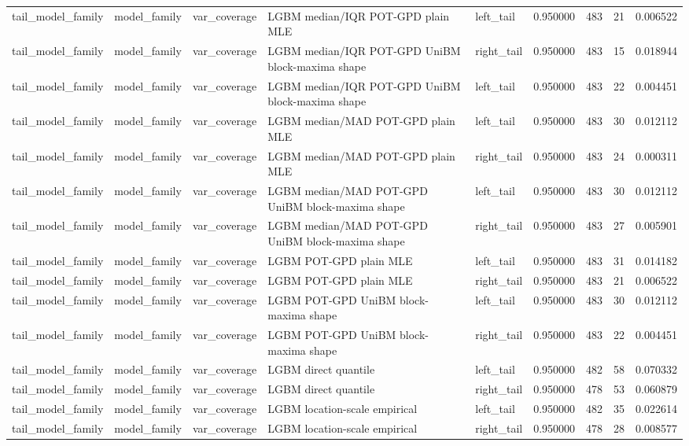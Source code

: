 \begin{tabular}{lllllrrrr}
tail\_model\_family & model\_family & var\_coverage & LGBM median/IQR POT-GPD plain MLE & left\_tail & 0.950000 & 483 & 21 & 0.006522 \\
tail\_model\_family & model\_family & var\_coverage & LGBM median/IQR POT-GPD UniBM block-maxima shape & right\_tail & 0.950000 & 483 & 15 & 0.018944 \\
tail\_model\_family & model\_family & var\_coverage & LGBM median/IQR POT-GPD UniBM block-maxima shape & left\_tail & 0.950000 & 483 & 22 & 0.004451 \\
tail\_model\_family & model\_family & var\_coverage & LGBM median/MAD POT-GPD plain MLE & left\_tail & 0.950000 & 483 & 30 & 0.012112 \\
tail\_model\_family & model\_family & var\_coverage & LGBM median/MAD POT-GPD plain MLE & right\_tail & 0.950000 & 483 & 24 & 0.000311 \\
tail\_model\_family & model\_family & var\_coverage & LGBM median/MAD POT-GPD UniBM block-maxima shape & left\_tail & 0.950000 & 483 & 30 & 0.012112 \\
tail\_model\_family & model\_family & var\_coverage & LGBM median/MAD POT-GPD UniBM block-maxima shape & right\_tail & 0.950000 & 483 & 27 & 0.005901 \\
tail\_model\_family & model\_family & var\_coverage & LGBM POT-GPD plain MLE & left\_tail & 0.950000 & 483 & 31 & 0.014182 \\
tail\_model\_family & model\_family & var\_coverage & LGBM POT-GPD plain MLE & right\_tail & 0.950000 & 483 & 21 & 0.006522 \\
tail\_model\_family & model\_family & var\_coverage & LGBM POT-GPD UniBM block-maxima shape & left\_tail & 0.950000 & 483 & 30 & 0.012112 \\
tail\_model\_family & model\_family & var\_coverage & LGBM POT-GPD UniBM block-maxima shape & right\_tail & 0.950000 & 483 & 22 & 0.004451 \\
tail\_model\_family & model\_family & var\_coverage & LGBM direct quantile & left\_tail & 0.950000 & 482 & 58 & 0.070332 \\
tail\_model\_family & model\_family & var\_coverage & LGBM direct quantile & right\_tail & 0.950000 & 478 & 53 & 0.060879 \\
tail\_model\_family & model\_family & var\_coverage & LGBM location-scale empirical & left\_tail & 0.950000 & 482 & 35 & 0.022614 \\
tail\_model\_family & model\_family & var\_coverage & LGBM location-scale empirical & right\_tail & 0.950000 & 478 & 28 & 0.008577 \\

\end{tabular}
